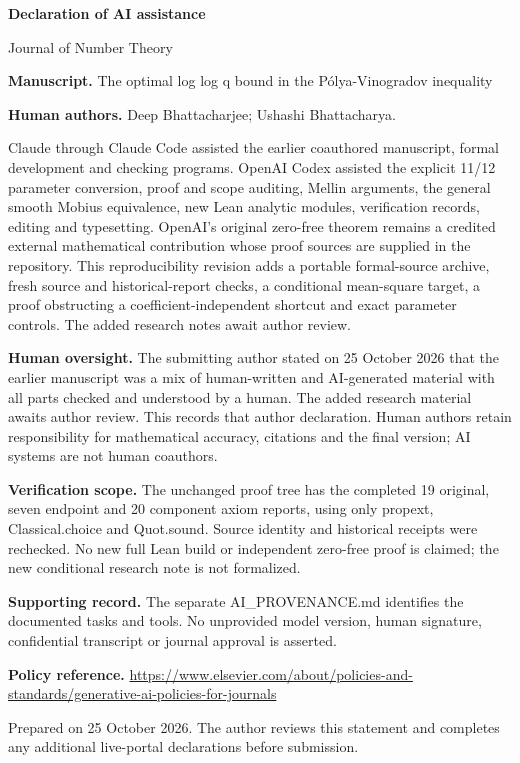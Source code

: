 \documentclass[11pt]{article}
\begin{document}
{\Large\bfseries\color{ink} Declaration of AI assistance}\par
Journal of Number Theory\par{}\par\medskip
\textbf{Manuscript.} The optimal log log q bound in the Pólya-Vinogradov inequality\par

\textbf{Human authors.} Deep Bhattacharjee; Ushashi Bhattacharya.\par

Claude through Claude Code assisted the earlier coauthored manuscript, formal development and checking programs. OpenAI Codex assisted the explicit 11/12 parameter conversion, proof and scope auditing, Mellin arguments, the general smooth Mobius equivalence, new Lean analytic modules, verification records, editing and typesetting. OpenAI's original zero-free theorem remains a credited external mathematical contribution whose proof sources are supplied in the repository. This reproducibility revision adds a portable formal-source archive, fresh source and historical-report checks, a conditional mean-square target, a proof obstructing a coefficient-independent shortcut and exact parameter controls. The added research notes await author review.\par

\textbf{Human oversight.} The submitting author stated on 25 October 2026 that the earlier manuscript was a mix of human-written and AI-generated material with all parts checked and understood by a human. The added research material awaits author review. This records that author declaration. Human authors retain responsibility for mathematical accuracy, citations and the final version; AI systems are not human coauthors.\par

\textbf{Verification scope.} The unchanged proof tree has the completed 19 original, seven endpoint and 20 component axiom reports, using only propext, Classical.choice and Quot.sound. Source identity and historical receipts were rechecked. No new full Lean build or independent zero-free proof is claimed; the new conditional research note is not formalized.\par

\textbf{Supporting record.} The separate AI\_PROVENANCE.md identifies the documented tasks and tools. No unprovided model version, human signature, confidential transcript or journal approval is asserted.\par

\textbf{Policy reference.} \url{https://www.elsevier.com/about/policies-and-standards/generative-ai-policies-for-journals}\par

{\small Prepared on 25 October 2026. The author reviews this statement and completes any additional live-portal declarations before submission.}
\end{document}
